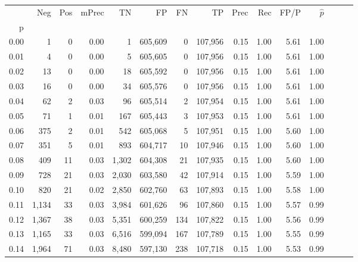 \begin{tabular}{rrrrrrrrrrrrrrr}
\toprule
{} &     Neg &    Pos & mPrec &       TN &       FP &       FN &       TP &  Prec &   Rec &  FP/P & $\hat{p}$ \\
p    &         &        &       &          &          &          &          &       &       &       &           \\
\midrule
0.00 &       1 &      0 &  0.00 &        1 &  605,609 &        0 &  107,956 &  0.15 &  1.00 &  5.61 &      1.00 \\
0.01 &       4 &      0 &  0.00 &        5 &  605,605 &        0 &  107,956 &  0.15 &  1.00 &  5.61 &      1.00 \\
0.02 &      13 &      0 &  0.00 &       18 &  605,592 &        0 &  107,956 &  0.15 &  1.00 &  5.61 &      1.00 \\
0.03 &      16 &      0 &  0.00 &       34 &  605,576 &        0 &  107,956 &  0.15 &  1.00 &  5.61 &      1.00 \\
0.04 &      62 &      2 &  0.03 &       96 &  605,514 &        2 &  107,954 &  0.15 &  1.00 &  5.61 &      1.00 \\
0.05 &      71 &      1 &  0.01 &      167 &  605,443 &        3 &  107,953 &  0.15 &  1.00 &  5.61 &      1.00 \\
0.06 &     375 &      2 &  0.01 &      542 &  605,068 &        5 &  107,951 &  0.15 &  1.00 &  5.60 &      1.00 \\
0.07 &     351 &      5 &  0.01 &      893 &  604,717 &       10 &  107,946 &  0.15 &  1.00 &  5.60 &      1.00 \\
0.08 &     409 &     11 &  0.03 &    1,302 &  604,308 &       21 &  107,935 &  0.15 &  1.00 &  5.60 &      1.00 \\
0.09 &     728 &     21 &  0.03 &    2,030 &  603,580 &       42 &  107,914 &  0.15 &  1.00 &  5.59 &      1.00 \\
0.10 &     820 &     21 &  0.02 &    2,850 &  602,760 &       63 &  107,893 &  0.15 &  1.00 &  5.58 &      1.00 \\
0.11 &   1,134 &     33 &  0.03 &    3,984 &  601,626 &       96 &  107,860 &  0.15 &  1.00 &  5.57 &      0.99 \\
0.12 &   1,367 &     38 &  0.03 &    5,351 &  600,259 &      134 &  107,822 &  0.15 &  1.00 &  5.56 &      0.99 \\
0.13 &   1,165 &     33 &  0.03 &    6,516 &  599,094 &      167 &  107,789 &  0.15 &  1.00 &  5.55 &      0.99 \\
0.14 &   1,964 &     71 &  0.03 &    8,480 &  597,130 &      238 &  107,718 &  0.15 &  1.00 &  5.53 &      0.99 \\

\end{tabular}
